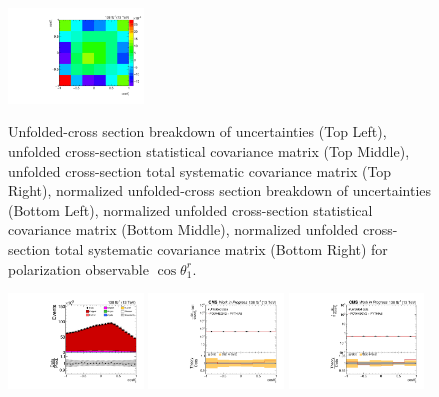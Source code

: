 \begin{refsection}
\begin{figure}[htb]
\begin{center}
 \includegraphics[width=0.32\textwidth]{fig_fullRun2UL/unfolding/combined/TotalSystCovMatrixNorm_rebinnedB_b1r.pdf} \\
\caption{Unfolded-cross section breakdown of uncertainties (Top Left), unfolded cross-section statistical covariance matrix (Top Middle), unfolded cross-section total systematic covariance matrix (Top Right), normalized unfolded-cross section breakdown of uncertainties (Bottom Left), normalized unfolded cross-section statistical covariance matrix (Bottom Middle), normalized unfolded cross-section total systematic covariance matrix (Bottom Right) for polarization observable $\cos\theta_{1}^{r}$.}
\label{fig:b1r_uncertainties}
\end{center}
\end{figure}
\clearpage
\begin{figure}[htb]
\begin{center}
 \includegraphics[width=0.32\textwidth]{fig_fullRun2UL/controlplots/combined/Hyp_LeptonBr.pdf}
 \includegraphics[width=0.32\textwidth]{fig_fullRun2UL/unfolding/combined/UnfoldedResults_b2r.pdf}
 \includegraphics[width=0.32\textwidth]{fig_fullRun2UL/unfolding/combined/UnfoldedResultsNorm_b2r.pdf} \\

\end{center}
\end{figure}
\end{refsection}
